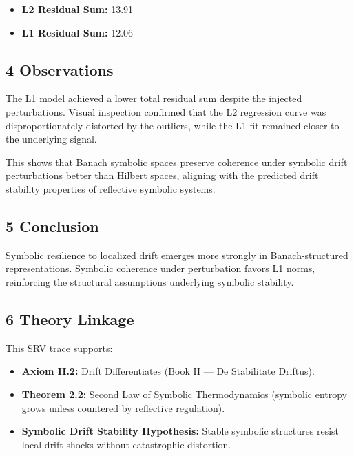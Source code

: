 \begin{itemize}
    \item \textbf{L2 Residual Sum:} 13.91
    \item \textbf{L1 Residual Sum:} 12.06
\end{itemize}

\subsection*{4 Observations}
\label{subsection:trace1_observations}

The L1 model achieved a lower total residual sum despite the injected perturbations. Visual inspection confirmed that the L2 regression curve was disproportionately distorted by the outliers, while the L1 fit remained closer to the underlying signal.

This shows that Banach symbolic spaces preserve coherence under symbolic drift perturbations better than Hilbert spaces, aligning with the predicted drift stability properties of reflective symbolic systems.

\subsection*{5 Conclusion}
\label{subsection:trace1_conclusion}

Symbolic resilience to localized drift emerges more strongly in Banach-structured representations. Symbolic coherence under perturbation favors L1 norms, reinforcing the structural assumptions underlying symbolic stability.

\subsection*{6 Theory Linkage}
\label{subsection:trace1_theory_linkage}

This SRV trace supports:
\begin{itemize}
    \item \textbf{Axiom II.2:} Drift Differentiates (Book II — De Stabilitate Driftus).
    \item \textbf{Theorem 2.2:} Second Law of Symbolic Thermodynamics (symbolic entropy grows unless countered by reflective regulation).
    \item \textbf{Symbolic Drift Stability Hypothesis:} Stable symbolic structures resist local drift shocks without catastrophic distortion.
\end{itemize}
